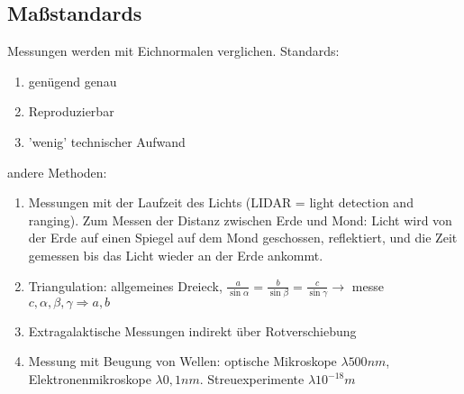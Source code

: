 \documentclass[a4paper,12pt]{article}
\numberwithin{equation}{section}
\begin{document}
\subsection{Maßstandards}
Messungen werden mit Eichnormalen verglichen. Standards:
\begin{enumerate}[wide,label=$\cdot$]
        \item genügend genau
        \item Reproduzierbar
        \item 'wenig' technischer Aufwand
\end{enumerate}
andere Methoden:
\begin{enumerate}[wide,label=$\cdot$]
        \item Messungen mit der Laufzeit des Lichts (LIDAR = light detection and ranging). Zum Messen der Distanz zwischen Erde und Mond: Licht wird von der Erde auf einen Spiegel auf dem Mond geschossen, reflektiert, und die Zeit gemessen bis das Licht wieder an der Erde ankommt.
        \item Triangulation: allgemeines Dreieck, $\tfrac{a}{\sin \alpha }=\tfrac{b}{\sin \beta}=\tfrac{c}{\sin \gamma } \rightarrow $ messe $c,\alpha,\beta,\gamma \Rightarrow a,b $  
        \item Extragalaktische Messungen indirekt über Rotverschiebung \item Messung mit Beugung von Wellen: optische Mikroskope $\lambda 500nm$, Elektronenmikroskope $\lambda 0,1nm$. Streuexperimente $\lambda 10^{-18}m$ 

\end{enumerate}
\end{document}
